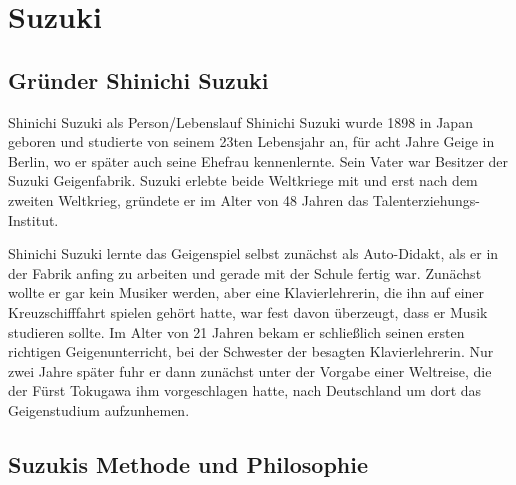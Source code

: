 \section{Suzuki}

\subsection{Gründer Shinichi Suzuki} Shinichi Suzuki als Person/Lebenslauf
Shinichi Suzuki wurde 1898 in Japan geboren und studierte
von seinem 23ten Lebensjahr an, für acht Jahre Geige
in Berlin, wo er später auch seine Ehefrau kennenlernte. Sein
Vater war Besitzer der Suzuki Geigenfabrik. Suzuki erlebte beide Weltkriege mit und erst nach
dem zweiten Weltkrieg, gründete er im Alter von 48 Jahren das
Talenterziehungs-Institut. 

Shinichi Suzuki lernte das Geigenspiel selbst zunächst als Auto-Didakt, als er in der Fabrik
anfing zu arbeiten und gerade mit der Schule fertig war. Zunächst wollte er gar
kein Musiker werden, aber eine Klavierlehrerin, die ihn auf einer
Kreuzschifffahrt spielen gehört hatte, war fest davon überzeugt, dass er Musik studieren
sollte. \autocite[89]{suzuki:erziehung_ist_liebe}
Im Alter von 21 Jahren bekam er schließlich seinen ersten richtigen Geigenunterricht, bei der Schwester
der besagten Klavierlehrerin. Nur zwei Jahre später fuhr er dann zunächst unter der Vorgabe einer Weltreise, die der
Fürst Tokugawa ihm vorgeschlagen hatte, nach Deutschland um dort das Geigenstudium aufzunhemen. \autocite[90ff]{suzuki:erziehung_ist_liebe}

\subsection{Suzukis Methode und Philosophie}

